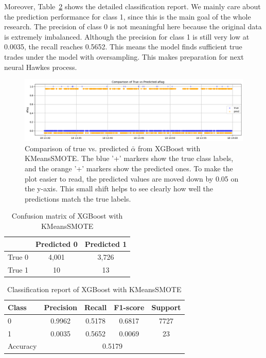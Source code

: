 Moreover, Table~\ref{tab:xgb-classification-report-km} shows the detailed classification report. We mainly care about the prediction performance for class 1, since this is the main goal of the whole research. The precision of class 0 is not meaningful here because the original data is extremely imbalanced. Although the precision for class 1 is still very low at 0.0035, the recall reaches 0.5652. This means the model finds sufficient true trades under the model with oversampling. This makes preparation for next neural Hawkes process.


\begin{figure}[H]
    \centering
    \includegraphics[width=\textwidth]{figures/aflag_XGBoost_181330.png}
    \caption{Comparison of true vs. predicted $\bar{\alpha}$ from XGBoost with KMeansSMOTE. 
    The blue '+' markers show the true class labels, and the orange '+' markers show the predicted ones. To make the plot easier to read, the predicted values are moved down by 0.05 on the y-axis. This small shift helps to see clearly how well the predictions match the true labels.
    }
    \label{fig:xgb-pred-vs-true-km}
\end{figure}

\begin{table}[H]
    \centering
    \caption{Confusion matrix of XGBoost with KMeansSMOTE}
    \label{tab:xgb-confusion-km}
    \begin{tabular}{lcc}
        \toprule
        & Predicted 0 & Predicted 1 \\
        \midrule
        True 0 & 4,001 & 3,726 \\
        True 1 & 10 & 13 \\
        \bottomrule
    \end{tabular}
\end{table}
\begin{table}[H]
    \centering
    \caption{Classification report of XGBoost with KMeansSMOTE}
    \label{tab:xgb-classification-report-km}
    \begin{tabular}{lcccc}
        \toprule
        Class & Precision & Recall & F1-score & Support \\
        \midrule
        0 & 0.9962 & 0.5178 & 0.6817 & 7727 \\
        1 & 0.0035 & 0.5652 & 0.0069 & 23 \\
        \midrule
        Accuracy & \multicolumn{4}{c}{0.5179} \\
        \bottomrule
    \end{tabular}
\end{table}


